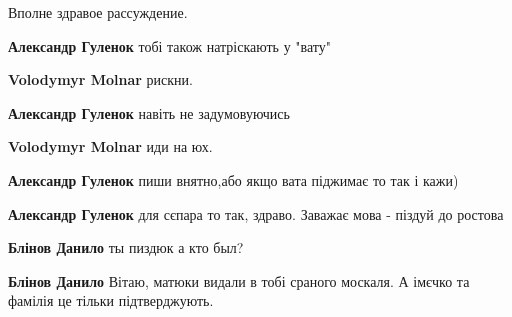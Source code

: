 \begin{itemize}

Вполне здравое рассуждение.

\begin{itemize}

\textbf{Александр Гуленок} тобі також натріскають у "вату"


\textbf{Volodymyr Molnar} рискни.


\textbf{Александр Гуленок} навіть не задумовуючись


\textbf{Volodymyr Molnar} иди на юх.


\textbf{Александр Гуленок} пиши внятно,або якщо вата піджимає то так і кажи)


\textbf{Александр Гуленок} для сєпара то так, здраво. Заважає мова - піздуй до ростова


\textbf{Блінов Данило} ты пиздюк а кто был?


\textbf{Блінов Данило} Вітаю, матюки видали в тобі сраного москаля. А імєчко та фамілія це тільки підтверджують.
\end{itemize}



\end{itemize}
